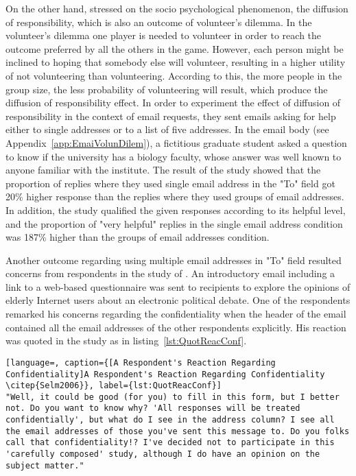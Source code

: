 On the other hand, \cite{Barron2002} stressed on the socio psychological phenomenon, the diffusion of responsibility, which is also an outcome of volunteer's dilemma. In the volunteer's dilemma one player is needed to volunteer in order to reach the outcome preferred by all the others in the game. However, each person might be inclined to hoping that somebody else will volunteer, resulting in a higher utility of not volunteering than volunteering. According to this, the more people in the group size, the less probability of volunteering will result, which produce the diffusion of responsibility effect. In order to experiment the effect of diffusion of responsibility in the context of email requests, they sent emails asking for help either to single addresses or to a list of five addresses. In the email body (see Appendix~\ref{app:EmaiVolunDilem}), a fictitious graduate student asked a question to know if the university has a biology faculty, whose answer was well known to anyone familiar with the institute. The result of the study showed that the proportion of replies where they used single email address in the "To" field got 20\% higher response than the replies where they used groups of email addresses. In addition, the study qualified the given responses according to its helpful level, and the proportion of "very helpful" replies in the single email address condition was 187\% higher than the groups of email addresses condition.
\vspace{1cm}

Another outcome regarding using multiple email addresses in "To" field resulted concerns from respondents in the study of \cite{Selm2006}. An introductory email including a link to a web-based questionnaire was sent to recipients to explore the opinions of elderly Internet users about an electronic political debate. One of the respondents remarked his concerns regarding the confidentiality when the header of the email contained all the email addresses of the other respondents explicitly. His reaction was quoted in the study as in listing~\ref{lst:QuotReacConf}.
\vspace{1cm}

\clearpage


\begin{lstlisting}[language=, caption={[A Respondent's Reaction Regarding Confidentiality]A Respondent's Reaction Regarding Confidentiality \citep{Selm2006}}, label={lst:QuotReacConf}]
"Well, it could be good (for you) to fill in this form, but I better not. Do you want to know why? 'All responses will be treated confidentially', but what do I see in the address column? I see all the email addresses of those you've sent this message to. Do you folks call that confidentiality!? I've decided not to participate in this 'carefully composed' study, although I do have an opinion on the subject matter."
\end{lstlisting}

